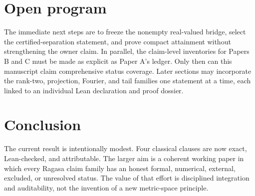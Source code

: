 \documentclass[11pt]{article}
\begin{document}
\section{Open program}

The immediate next steps are to freeze the nonempty real-valued bridge, select the
certified-separation statement, and prove compact attainment without strengthening the
owner claim. In parallel, the claim-level inventories for Papers B and C must be made as
explicit as Paper A's ledger. Only then can this manuscript claim comprehensive status
coverage. Later sections may incorporate the rank-two, projection, Fourier, and tail
families one statement at a time, each linked to an individual Lean declaration and
proof dossier.

\section{Conclusion}

The current result is intentionally modest. Four classical clauses are now exact, Lean-checked, and attributable. The larger aim is a coherent
working paper in which every Ragasa claim family has an honest formal, numerical,
external, excluded, or unresolved status. The value of that effort is disciplined
integration and auditability, not the invention of a new metric-space principle.
\end{document}
